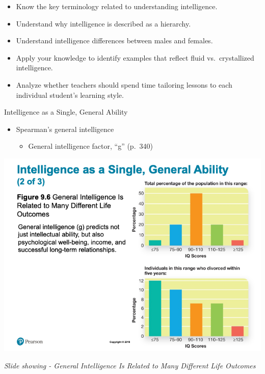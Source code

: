 \documentclass[
]{book}
\providecommand{\tightlist}{%
  \setlength{\itemsep}{0pt}\setlength{\parskip}{0pt}}
\begin{document}
\begin{reflect}
\begin{itemize}
\tightlist
\item
  Know the key terminology related to understanding intelligence.\\
\item
  Understand why intelligence is described as a hierarchy.\\
\item
  Understand intelligence differences between males and females.\\
\item
  Apply your knowledge to identify examples that reflect fluid vs.~crystallized intelligence.\\
\item
  Analyze whether teachers should spend time tailoring lessons to each individual student's learning style.
\end{itemize}

Intelligence as a Single, General Ability

\begin{itemize}
\tightlist
\item
  Spearman's general intelligence

  \begin{itemize}
  \tightlist
  \item
    General intelligence factor, ``g'' (p.~340)
  \end{itemize}
\end{itemize}

\includegraphics{assets/unit_2/slide_23.png}

\emph{Slide showing - General Intelligence Is Related to Many Different Life Outcomes}


\end{reflect}
\end{document}
